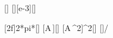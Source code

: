 [\Hz]
[\milli\meter][e-3][\meter]

[2\pi f]{2*pi*\fX}[\per\second]
[A\,\omega]{\AX*\omX}[\mps]
[A\,\omega^2]{\AX*\omX^2}[\mpss]
[]{\amaxX/\ncgX}
